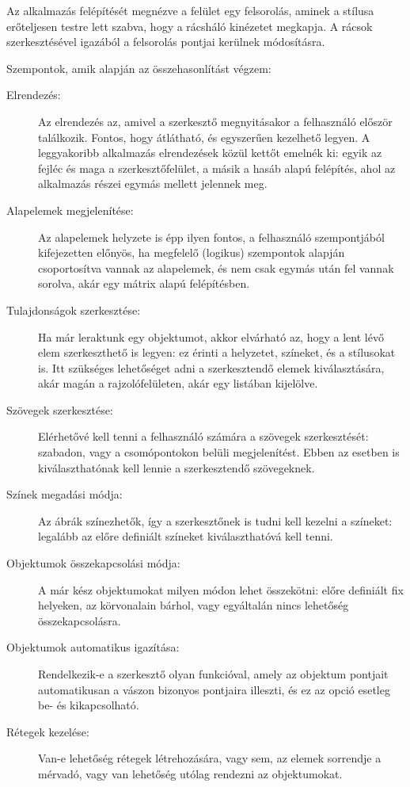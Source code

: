 Az alkalmazás felépítését megnézve a felület egy felsorolás, aminek a stílusa erőteljesen testre lett szabva, hogy a rácsháló kinézetet megkapja. A rácsok szerkesztésével igazából a felsorolás pontjai kerülnek módosításra.


Szempontok, amik alapján az összehasonlítást végzem:

\begin{description}
	\item[Elrendezés:] Az elrendezés az, amivel a szerkesztő megnyitásakor a felhasználó először találkozik. Fontos, hogy átlátható, és egyszerűen kezelhető legyen. A leggyakoribb alkalmazás elrendezések közül kettőt emelnék ki: egyik az fejléc és maga a szerkesztőfelület, a másik a hasáb alapú felépítés, ahol az alkalmazás részei egymás mellett jelennek meg. 
	\item[Alapelemek megjelenítése:] Az alapelemek helyzete is épp ilyen fontos, a felhasználó szempontjából kifejezetten előnyös, ha megfelelő (logikus) szempontok alapján csoportosítva vannak az alapelemek, és nem csak egymás után fel vannak sorolva, akár egy mátrix alapú felépítésben.
	\item[Tulajdonságok szerkesztése:] Ha már leraktunk egy objektumot, akkor elvárható az, hogy a lent lévő elem szerkeszthető is legyen: ez érinti a helyzetet, színeket, és a stílusokat is. Itt szükséges lehetőséget adni a szerkesztendő elemek kiválasztására, akár magán a rajzolófelületen, akár egy listában kijelölve.
	\item[Szövegek szerkesztése:] Elérhetővé kell tenni a felhasználó számára a szövegek szerkesztését: szabadon, vagy a csomópontokon belüli megjelenítést. Ebben az esetben is kiválaszthatónak kell lennie a szerkesztendő szövegeknek.
	\item[Színek megadási módja:] Az ábrák színezhetők, így a szerkesztőnek is tudni kell kezelni a színeket: legalább az előre definiált színeket kiválaszthatóvá kell tenni.
	\item[Objektumok összekapcsolási módja:] A már kész objektumokat milyen módon lehet összekötni: előre definiált fix helyeken, az körvonalain bárhol, vagy egyáltalán nincs lehetőség összekapcsolásra. 
	\item[Objektumok automatikus igazítása:] Rendelkezik-e a szerkesztő olyan funkcióval, amely az objektum pontjait automatikusan a vászon bizonyos pontjaira illeszti, és ez az opció esetleg be- és kikapcsolható.
	\item[Rétegek kezelése:] Van-e lehetőség rétegek létrehozására, vagy sem, az elemek sorrendje a mérvadó, vagy van lehetőség utólag rendezni az objektumokat. 

\end{description}

